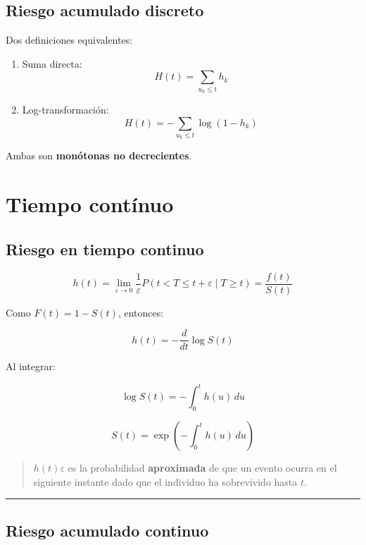 \documentclass[
  letterpaper,
  DIV=11,
  numbers=noendperiod]{scrartcl}
\begin{document}
\subsection{Riesgo acumulado discreto}\label{riesgo-acumulado-discreto}

Dos definiciones equivalentes:

\begin{enumerate}
\def\labelenumi{\arabic{enumi}.}
\item
  Suma directa: \[
  H(t) = \sum_{u_k \le t} h_k
  \]
\item
  Log-transformación: \[
  H(t) = - \sum_{u_k \le t} \log(1 - h_k)
  \]
\end{enumerate}

Ambas son \textbf{monótonas no decrecientes}.

\section{Tiempo contínuo}\label{tiempo-contuxednuo}

\subsection{Riesgo en tiempo continuo}\label{riesgo-en-tiempo-continuo}

\[
h(t) = \lim_{\varepsilon \to 0} \frac{1}{\varepsilon} P(t < T \le t + \varepsilon \mid T \ge t)
= \frac{f(t)}{S(t)}
\]

Como \(F(t) = 1 - S(t)\), entonces:

\[
h(t) = -\frac{d}{dt} \log S(t)
\]

Al integrar:

\[
\log S(t) = -\int_0^t h(u) \, du
\]

\[
S(t) = \exp\left(-\int_0^t h(u) \, du\right)
\]

\begin{quote}
\(h(t)\varepsilon\) es la probabilidad \textbf{aproximada} de que un
evento ocurra en el siguiente instante dado que el individuo ha
sobrevivido hasta \(t\).
\end{quote}

\begin{center}\rule{0.5\linewidth}{0.5pt}\end{center}

\subsection{Riesgo acumulado continuo}\label{riesgo-acumulado-continuo}
\end{document}
